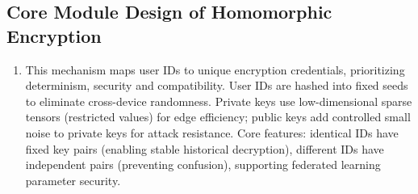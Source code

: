 \documentclass[runningheads]{llncs}
\begin{document}
\subsection{Core Module Design of Homomorphic Encryption}
\begin{enumerate}
\item This mechanism maps user IDs to unique encryption credentials, prioritizing determinism, security and compatibility. User IDs are hashed into fixed seeds to eliminate cross-device randomness. Private keys use low-dimensional sparse tensors (restricted values) for edge efficiency; public keys add controlled small noise to private keys for attack resistance. Core features: identical IDs have fixed key pairs (enabling stable historical decryption), different IDs have independent pairs (preventing confusion), supporting federated learning parameter security.


\end{enumerate}
\end{document}
